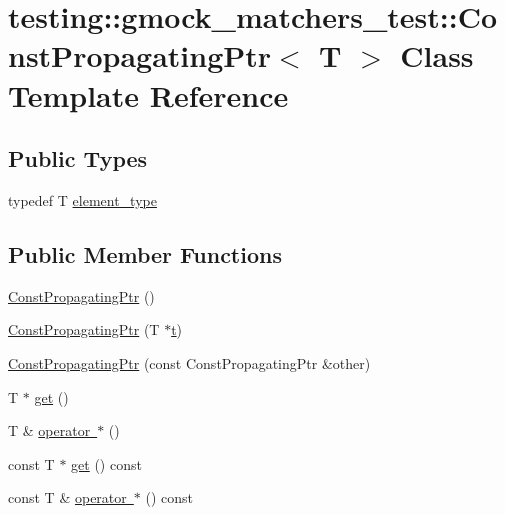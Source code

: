 \hypertarget{classtesting_1_1gmock__matchers__test_1_1_const_propagating_ptr}{}\section{testing\+::gmock\+\_\+matchers\+\_\+test\+::Const\+Propagating\+Ptr$<$ T $>$ Class Template Reference}
\label{classtesting_1_1gmock__matchers__test_1_1_const_propagating_ptr}
\subsection*{Public Types}
\begin{DoxyCompactItemize}
\item 
typedef T \mbox{\hyperlink{classtesting_1_1gmock__matchers__test_1_1_const_propagating_ptr_a2ad1f3127185fadd33eed42627ed5644}{element\+\_\+type}}
\end{DoxyCompactItemize}
\subsection*{Public Member Functions}
\begin{DoxyCompactItemize}
\item 
\mbox{\hyperlink{classtesting_1_1gmock__matchers__test_1_1_const_propagating_ptr_abdda67deda67ed234da2231fd86f05ed}{Const\+Propagating\+Ptr}} ()
\item 
\mbox{\hyperlink{classtesting_1_1gmock__matchers__test_1_1_const_propagating_ptr_a06da70663daa274fb8ca3352f039d609}{Const\+Propagating\+Ptr}} (T $\ast$\mbox{\hyperlink{_mutual_8h_a978d88b393c8a37dc2614c88788b3442}{t}})
\item 
\mbox{\hyperlink{classtesting_1_1gmock__matchers__test_1_1_const_propagating_ptr_ae7620c62ba340603968896d5d5400ed1}{Const\+Propagating\+Ptr}} (const Const\+Propagating\+Ptr \&other)
\item 
T $\ast$ \mbox{\hyperlink{classtesting_1_1gmock__matchers__test_1_1_const_propagating_ptr_a39a09d46453380ec1b8be8ce40adc453}{get}} ()
\item 
T \& \mbox{\hyperlink{classtesting_1_1gmock__matchers__test_1_1_const_propagating_ptr_a2bca17628b50e37f8ea323b0e80bdc3a}{operator $\ast$}} ()
\item 
const T $\ast$ \mbox{\hyperlink{classtesting_1_1gmock__matchers__test_1_1_const_propagating_ptr_a92d7c8429246ef33a020e8a3d840b9c3}{get}} () const
\item 
const T \& \mbox{\hyperlink{classtesting_1_1gmock__matchers__test_1_1_const_propagating_ptr_af081ba59bba8a9453c4537aab846ebaf}{operator $\ast$}} () const
\end{DoxyCompactItemize}
